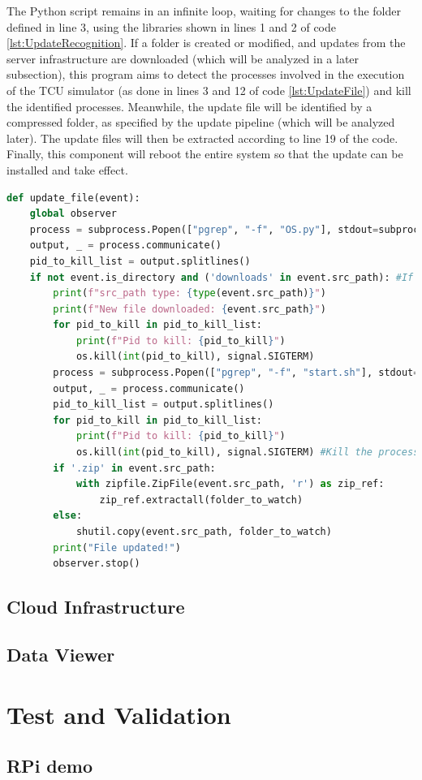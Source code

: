 The Python script remains in an infinite loop, waiting for changes to the folder defined in line 3, using the libraries shown in lines 1 and 2 of code \ref{lst:UpdateRecognition}.
If a folder is created or modified, and updates from the server infrastructure are downloaded (which will be analyzed in a later subsection), this program aims to detect the processes involved in the execution of the TCU simulator (as done in lines 3 and 12 of code \ref{lst:UpdateFile}) and kill the identified processes. Meanwhile, the update file will be identified by a compressed folder, as specified by the update pipeline (which will be analyzed later). The update files will then be extracted according to line 19 of the code. Finally, this component will reboot the entire system so that the update can be installed and take effect.
\begin{lstlisting}[language=Python, caption={Code for performing actions when the designated download folder is changed}, label=lst:UpdateFile]
def update_file(event):
    global observer
    process = subprocess.Popen(["pgrep", "-f", "OS.py"], stdout=subprocess.PIPE, text=True)
    output, _ = process.communicate()
    pid_to_kill_list = output.splitlines()
    if not event.is_directory and ('downloads' in event.src_path): #If the new item is a directory
        print(f"src_path type: {type(event.src_path)}")
        print(f"New file downloaded: {event.src_path}")
        for pid_to_kill in pid_to_kill_list:
            print(f"Pid to kill: {pid_to_kill}")
            os.kill(int(pid_to_kill), signal.SIGTERM)    
        process = subprocess.Popen(["pgrep", "-f", "start.sh"], stdout=subprocess.PIPE, text=True)
        output, _ = process.communicate()
        pid_to_kill_list = output.splitlines()
        for pid_to_kill in pid_to_kill_list:
            print(f"Pid to kill: {pid_to_kill}")
            os.kill(int(pid_to_kill), signal.SIGTERM) #Kill the process
        if '.zip' in event.src_path:
            with zipfile.ZipFile(event.src_path, 'r') as zip_ref:
                zip_ref.extractall(folder_to_watch)
        else:
            shutil.copy(event.src_path, folder_to_watch)          
        print("File updated!")
        observer.stop()
\end{lstlisting}
\subsection{Cloud Infrastructure}
\subsection{Data Viewer}

\section{Test and Validation}
\subsection{RPi demo}